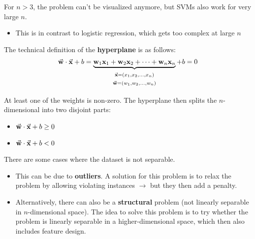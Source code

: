 For $n>3$, the problem can't be visualized anymore, but SVMs also work for very large $n$.
\begin{itemize}
  \item This is in contrast to logistic regression, which gets too complex at large $n$
\end{itemize}

The technical definition of the \textbf{hyperplane} is as follows:
\begin{align*}
  \vec{\mathbf{w}} \cdot \vec{\mathbf{x}} + b 
  = \underbrace{\mathbf{w}_1\mathbf{x}_1 + \mathbf{w}_2\mathbf{x}_2 + \cdots +\mathbf{w}_n\mathbf{x}_n}_{\begin{array}{c}\scriptstyle\vec{\mathbf{x}}=(x_1, x_2, \dots, x_n)\\\scriptstyle\vec{\mathbf{w}}=(w_1, w_2, \dots, w_n)\end{array}} + b 
  = 0
\end{align*}

At least one of the weights is non-zero. The hyperplane then splits the $n$-dimensional into two disjoint parts:
\begin{itemize}
  \item $\vec{\mathbf{w}} \cdot \vec{\mathbf{x}} + b \geq 0$
  \item $\vec{\mathbf{w}} \cdot \vec{\mathbf{x}} + b < 0$
\end{itemize}

There are some cases where the dataset is not separable. 
\begin{itemize}
  \item This can be due to \textbf{outliers}. A solution for this problem is to relax the problem by allowing violating instances $\rightarrow$ but they then add a penalty.
  \item Alternatively, there can also be a \textbf{structural} problem (not linearly separable in $n$-dimensional space). The idea to solve this problem is to try whether the problem is linearly separable in a higher-dimensional space, which then also includes feature design.
\end{itemize}

